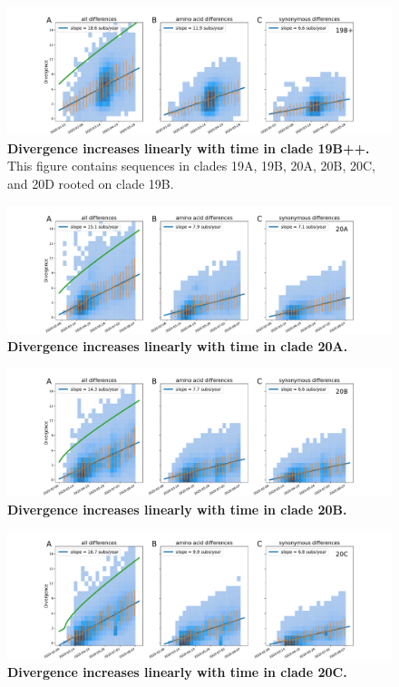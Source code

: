 \begin{figure}[h]
    \includegraphics[width=\textwidth]{figures/rtt/19B+_rtt.pdf}
    \caption{{\bf Divergence increases linearly with time in clade 19B++.}
    This figure contains sequences in clades 19A, 19B, 20A, 20B, 20C, and 20D rooted on clade 19B.
    \label{fig:19B++_divergence}}
\end{figure}

\begin{figure}[h]
    \includegraphics[width=\textwidth]{figures/rtt/20A_rtt.pdf}
    \caption{{\bf Divergence increases linearly with time in clade 20A.}
    \label{fig:20A_divergence}}
\end{figure}

\begin{figure}[h]
    \includegraphics[width=\textwidth]{figures/rtt/20B_rtt.pdf}
    \caption{{\bf Divergence increases linearly with time in clade 20B.}
    \label{fig:20B_divergence}}
\end{figure}

\begin{figure}[h]
    \includegraphics[width=\textwidth]{figures/rtt/20C_rtt.pdf}
    \caption{{\bf Divergence increases linearly with time in clade 20C.}
    \label{fig:20C_divergence}}
\end{figure}


